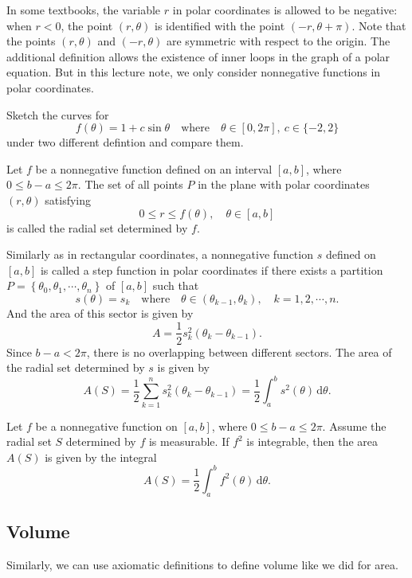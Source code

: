 \documentclass[a4paper]{ctexart}
\begin{document}
	\begin{myrmk}
		In some textbooks, the variable $r$ in polar coordinates is allowed to be negative: when $r<0$, the point $(r,\theta)$ is identified with the point $(-r,\theta+\pi)$.  Note that the points $(r,\theta)$ and $(-r,\theta)$ are symmetric with respect to the origin. The additional definition allows the existence of inner loops in the graph of a polar equation. But in this lecture note, we only consider nonnegative functions in polar coordinates.
	\end{myrmk}
	\begin{myex}
		Sketch the curves for
		\[
		f(\theta)=1+c\sin\theta\quad \text{where}\quad\theta\in[0,2\pi],\ c\in\{-2,2\}
		\]
		under two different defintion and compare them.
	\end{myex}
	\begin{mydef}
		Let $f$ be a nonnegative function defined on an interval $[a,b]$, where $0\le b-a\le 2\pi$. The set of all points $P$ in the plane with polar coordinates $(r,\theta)$ satisfying
		\[
		0\le r \le f(\theta),\quad \theta\in [a,b]
		\]
		is called the radial set determined by $f$.
	\end{mydef}
	\begin{mydef}
		Similarly as in rectangular coordinates, a nonnegative function $s$ defined on $[a,b]$ is called a step function in polar coordinates if there exists a partition $P=\left\{\theta_0,\theta_1,\cdots,\theta_n\right\}$ of $[a,b]$ such that
		\[
		s(\theta)=s_k\quad\text{where}\quad \theta \in (\theta_{k-1},\theta_k),\quad k=1,2,\cdots,n.
		\]
		And the area of this sector is given by
		\[
		A=\frac12 s_k^2(\theta_k-\theta_{k-1}).
		\]
		Since $b-a<2\pi$, there is no overlapping between different sectors. The area of the radial set determined by $s$ is given by
		\[
		A(S)=\frac12 \sum_{k=1}^n s_k^2(\theta_k-\theta_{k-1})=\frac12 \int_a^b s^2(\theta)\,\mathrm{d}\theta.
		\]
	\end{mydef}
	\begin{mythm}
		Let $f$ be a nonnegative function on $[a,b]$, where $0\le b-a\le 2\pi$. Assume the radial set $S$ determined by $f$ is measurable. If $f^2$ is integrable, then the area $A(S)$ is given by the integral
		\[
		A(S)=\frac12 \int_a^b f^2(\theta)\,\mathrm{d}\theta.
		\]
	\end{mythm}


	\subsection{Volume}
	Similarly, we can use axiomatic definitions to define volume like we did for area.
\end{document}
